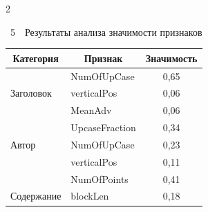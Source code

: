 \begin{multicols}{2}


{\small %


\vspace*{1pt}


    \begin{center}


    \noindent


{{\tablename~5}\ \ \small{Результаты анализа значимости признаков}}


    \vspace*{2ex}


    


    \begin{tabular}{|l|l|c|}


        \hline


 \multicolumn{1}{|c|}{Категория}& \multicolumn{1}{c|}{Признак} &


        \multicolumn{1}{c|}{Значимость} \\


        \hline


        & {NumOfUpCase} & 0,65 \\




{Заголовок}        & {verticalPos} & 0,06 


\\




        & {MeanAdv} & 0,06 \\


          \hline


&  {UpcaseFraction} & 0,34 \\




    Автор     & {NumOfUpCase} & 0,23\\




        & {verticalPos} & 0,11\\




                \hline


 &  NumOfPoints & 0,41\\




        Содержание        & blockLen & 0,18 


\\



\end{tabular}
\end{center}}
\end{multicols}
